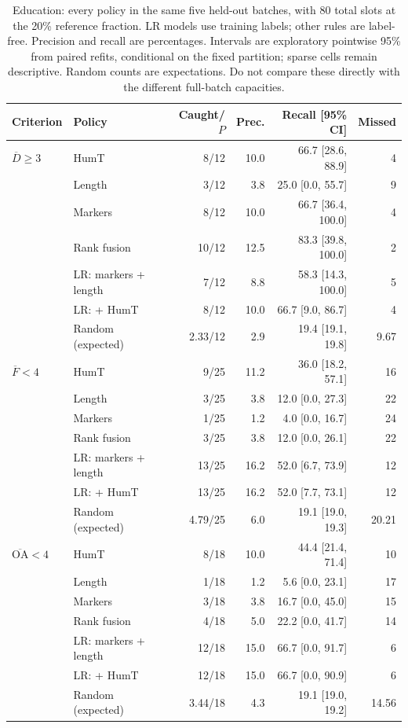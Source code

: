 \begin{table}[htbp]
\centering\small
\caption{Education: every policy in the same five held-out batches, with 80 total slots at the 20\% reference fraction. LR models use training labels; other rules are label-free. Precision and recall are percentages. Intervals are exploratory pointwise 95\% from paired refits, conditional on the fixed partition; sparse cells remain descriptive. Random counts are expectations. Do not compare these directly with the different full-batch capacities.}
\label{tab:held_education}
\begin{tabular}{llrrrr}
\toprule
Criterion & Policy & Caught/$P$ & Prec. & Recall [95\% CI] & Missed \\
\midrule
$\overline D\geq3$ & HumT & 8/12 & 10.0 & 66.7 [28.6, 88.9] & 4 \\
 & Length & 3/12 & 3.8 & 25.0 [0.0, 55.7] & 9 \\
 & Markers & 8/12 & 10.0 & 66.7 [36.4, 100.0] & 4 \\
 & Rank fusion & 10/12 & 12.5 & 83.3 [39.8, 100.0] & 2 \\
 & LR: markers + length & 7/12 & 8.8 & 58.3 [14.3, 100.0] & 5 \\
 & LR: + HumT & 8/12 & 10.0 & 66.7 [9.0, 86.7] & 4 \\
 & Random (expected) & 2.33/12 & 2.9 & 19.4 [19.1, 19.8] & 9.67 \\
$\overline F<4$ & HumT & 9/25 & 11.2 & 36.0 [18.2, 57.1] & 16 \\
 & Length & 3/25 & 3.8 & 12.0 [0.0, 27.3] & 22 \\
 & Markers & 1/25 & 1.2 & 4.0 [0.0, 16.7] & 24 \\
 & Rank fusion & 3/25 & 3.8 & 12.0 [0.0, 26.1] & 22 \\
 & LR: markers + length & 13/25 & 16.2 & 52.0 [6.7, 73.9] & 12 \\
 & LR: + HumT & 13/25 & 16.2 & 52.0 [7.7, 73.1] & 12 \\
 & Random (expected) & 4.79/25 & 6.0 & 19.1 [19.0, 19.3] & 20.21 \\
$\overline{\mathrm{OA}}<4$ & HumT & 8/18 & 10.0 & 44.4 [21.4, 71.4] & 10 \\
 & Length & 1/18 & 1.2 & 5.6 [0.0, 23.1] & 17 \\
 & Markers & 3/18 & 3.8 & 16.7 [0.0, 45.0] & 15 \\
 & Rank fusion & 4/18 & 5.0 & 22.2 [0.0, 41.7] & 14 \\
 & LR: markers + length & 12/18 & 15.0 & 66.7 [0.0, 91.7] & 6 \\
 & LR: + HumT & 12/18 & 15.0 & 66.7 [0.0, 90.9] & 6 \\
 & Random (expected) & 3.44/18 & 4.3 & 19.1 [19.0, 19.2] & 14.56 \\
\bottomrule
\end{tabular}
\end{table}
